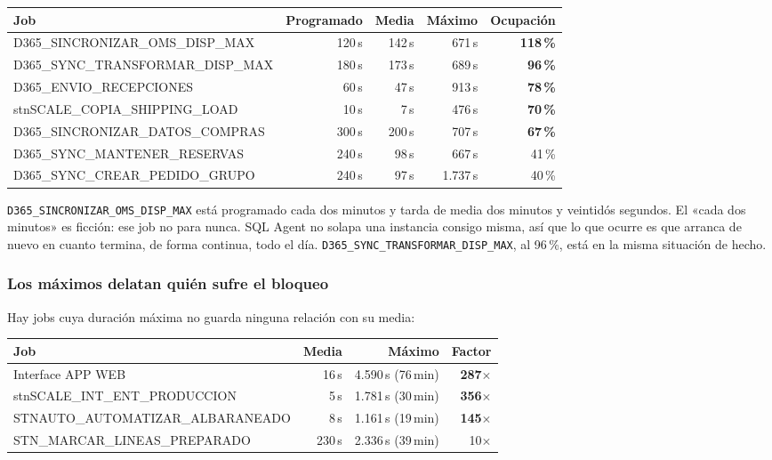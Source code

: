 \documentclass[11pt,a4paper]{article}
\newcommand{\cod}[1]{\texttt{\small #1}}
\newcommand{\critico}[1]{\textcolor{rojo}{\textbf{#1}}}
\newcommand{\aviso}[1]{\textcolor{ambar}{\textbf{#1}}}
\begin{document}
\begin{table}[h]
\centering
\small
\begin{tabular}{lrrrr}
\toprule
\textbf{Job} & \textbf{Programado} & \textbf{Media} & \textbf{Máximo} &
\textbf{Ocupación} \\
\midrule
D365\_SINCRONIZAR\_OMS\_DISP\_MAX  & 120\,s & 142\,s & 671\,s  & \critico{118\,\%} \\
D365\_SYNC\_TRANSFORMAR\_DISP\_MAX & 180\,s & 173\,s & 689\,s  & \critico{96\,\%} \\
D365\_ENVIO\_RECEPCIONES           &  60\,s &  47\,s & 913\,s  & \critico{78\,\%} \\
stnSCALE\_COPIA\_SHIPPING\_LOAD    &  10\,s &   7\,s & 476\,s  & \critico{70\,\%} \\
D365\_SINCRONIZAR\_DATOS\_COMPRAS  & 300\,s & 200\,s & 707\,s  & \aviso{67\,\%} \\
D365\_SYNC\_MANTENER\_RESERVAS     & 240\,s &  98\,s & 667\,s  & 41\,\% \\
D365\_SYNC\_CREAR\_PEDIDO\_GRUPO   & 240\,s &  97\,s & 1.737\,s & 40\,\% \\
\bottomrule
\end{tabular}
\end{table}

\cod{D365\_SINCRONIZAR\_OMS\_DISP\_MAX} está programado cada dos minutos y
tarda de media dos minutos y veintidós segundos. El «cada dos minutos» es
ficción: ese job no para nunca. SQL Agent no solapa una instancia consigo
misma, así que lo que ocurre es que arranca de nuevo en cuanto termina, de
forma continua, todo el día. \cod{D365\_SYNC\_TRANSFORMAR\_DISP\_MAX}, al
96\,\%, está en la misma situación de hecho.

\subsubsection*{Los máximos delatan quién sufre el bloqueo}

Hay jobs cuya duración máxima no guarda ninguna relación con su media:

\begin{table}[h]
\centering
\small
\begin{tabular}{lrrr}
\toprule
\textbf{Job} & \textbf{Media} & \textbf{Máximo} & \textbf{Factor} \\
\midrule
Interface APP WEB                 & 16\,s & 4.590\,s (76\,min) & \critico{287$\times$} \\
stnSCALE\_INT\_ENT\_PRODUCCION    &  5\,s & 1.781\,s (30\,min) & \critico{356$\times$} \\
STNAUTO\_AUTOMATIZAR\_ALBARANEADO &  8\,s & 1.161\,s (19\,min) & \critico{145$\times$} \\
STN\_MARCAR\_LINEAS\_PREPARADO    & 230\,s & 2.336\,s (39\,min) & 10$\times$ \\
\bottomrule
\end{tabular}
\end{table}
\end{document}
